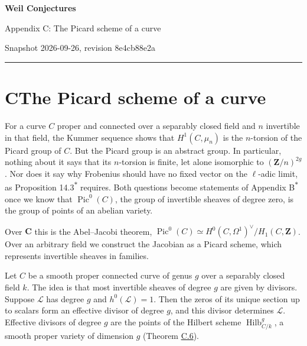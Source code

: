 \documentclass[11pt]{article}
\newcommand{\bpout}[1]{#1\textsuperscript{\hyperlink{bp-outside}{\ensuremath{\ast}}}}
\begin{document}
\pagestyle{plain}
\begin{center}
{\LARGE\bfseries Weil Conjectures\par}
\vspace{0.7em}
{\large Appendix C: The Picard scheme of a curve\par}
\vspace{0.5em}
{\small\color{bpmuted}Snapshot 2026-09-26, revision 8e4cb88e2a\par}
\end{center}
\vspace{0.5em}
{\small\tableofcontents}
\bigskip\hrule\bigskip

\section*{\texorpdfstring{C\quad The Picard scheme of a curve}{C The Picard scheme of a curve}}
\label{bp1}%
\label{bp2}%
For a curve \(C\) proper and connected over a separably closed field and \(n\) invertible in that field, the Kummer sequence shows that \(H^1(C,\mu_n)\) is the \(n\)-torsion of the Picard group of \(C\). But the Picard group is an abstract group. In particular, nothing about it says that its \(n\)-torsion is finite, let alone isomorphic to \((\mathbf Z/n)^{2g}\). Nor does it say why Frobenius should have no fixed vector on the \(\ell\)-adic limit, as Proposition \bpout{14.3} requires. Both questions become statements of Appendix \bpout{B} once we know that \(\operatorname{Pic}^0(C)\), the group of invertible sheaves of degree zero, is the group of points of an abelian variety.

Over \(\mathbf C\) this is the Abel–Jacobi theorem, \(\operatorname{Pic}^0(C)\simeq
H^0(C,\Omega^1)^\vee/H_1(C,\mathbf Z)\). Over an arbitrary field we construct the Jacobian as a Picard scheme, which represents invertible sheaves in families.

Let \(C\) be a smooth proper connected curve of genus \(g\) over a separably closed field \(k\). The idea is that most invertible sheaves of degree \(g\) are given by divisors. Suppose \(\mathcal L\) has degree \(g\) and \(h^0(\mathcal L)=1\). Then the zeros of its unique section up to scalars form an effective divisor of degree \(g\), and this divisor determines \(\mathcal L\). Effective divisors of degree \(g\) are the points of the Hilbert scheme \(\operatorname{Hilb}^{g}_{C/k}\), a smooth proper variety of dimension \(g\) (Theorem \hyperref[bp21]{C.6}).
\end{document}
